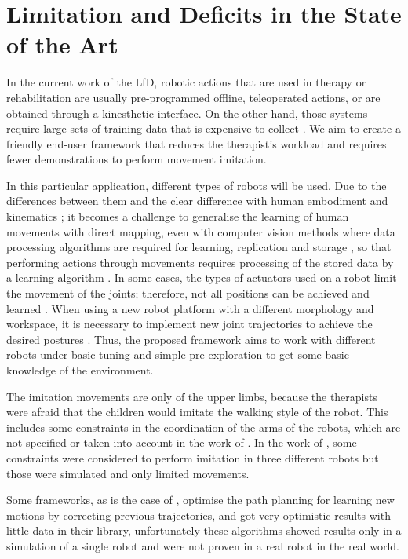 \documentclass[thesis]{mas_proposal}
\begin{document}
\section{Limitation and Deficits in the State of the Art}
    
    In the current work of the LfD, robotic actions that are used in therapy or rehabilitation are usually pre-programmed offline, teleoperated actions, or are obtained through a kinesthetic interface. On the other hand, those systems require large sets of training data that is expensive to collect \cite{Dinyari2020, Yan2010, Mandlekar2018}. We aim to create a friendly end-user framework that reduces the therapist's workload and requires fewer demonstrations to perform movement imitation.
    
    In this particular application, different types of robots will be used. Due to the differences between them and the clear difference with human embodiment and kinematics \cite{Koenemann2012}; it becomes a challenge to generalise the learning of human movements with direct mapping, even with computer vision methods where data processing algorithms are required for learning, replication and storage \cite{Liu2015}, so that performing actions through movements requires processing of the stored data by a learning algorithm \cite{Kober2010}. In some cases, the types of actuators used on a robot limit the movement of the joints; therefore, not all positions can be achieved and learned \cite{Almalki2020}. When using a new robot platform with a different morphology and workspace, it is necessary to implement new joint trajectories to achieve the desired postures \cite{VanPerre2015}. Thus, the proposed framework aims to work with different robots under basic tuning and simple pre-exploration to get some basic knowledge of the environment. 
    
    The imitation movements are only of the upper limbs, because the therapists were afraid that the children would imitate the walking style of the robot. This includes some constraints in the coordination of the arms of the robots, which are not specified or taken into account in the work of \cite{Liu2015, Fadli2018, Suleiman2008}. In the work of \cite{VanPerre2015}, some constraints were considered to perform imitation in three different robots but those were simulated and only limited movements.
    
    Some frameworks, as is the case of \cite{Berenson2012, Coleman2015}, optimise the path planning for learning new motions by correcting previous trajectories, and got very optimistic results with little data in their library, unfortunately these algorithms showed results only in a simulation of a single robot and were not proven in a real robot in the real world. 
    
\end{document}

